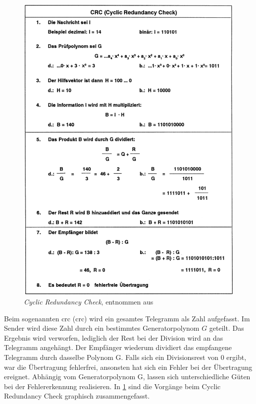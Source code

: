 \begin{figure}
\centering
\includegraphics[width=\textwidth]{abbildungen/20160314_crc}
\caption[\textit{Cyclic Redundancy Check}]{\textit{Cyclic Redundancy Check}, entnommen aus \cite[S.~38]{schn06}}
\label{fig:crc}
\end{figure}

Beim sogenannten \acrlong{crc} (\acrshort{crc}) wird ein gesamtes Telegramm als Zahl aufgefasst. Im Sender wird diese Zahl durch ein bestimmtes Generatorpolynom $G$ geteilt. Das Ergebnis wird verworfen, lediglich der Rest bei der Division wird an das Telegramm angehängt. Der Empfänger wiederum dividiert das empfangene Telegramm durch dasselbe Polynom G. Falls sich ein Divisionsrest von 0 ergibt, war die Übertragung fehlerfrei, ansonsten hat sich ein Fehler bei der Übertragung ereignet. Abhängig vom Generatorpolynom G, lassen sich unterschiedliche Güten bei der Fehlererkennung realisieren. In \ref{fig:crc} sind die Vorgänge beim Cyclic Redundancy Check graphisch zusammengefasst.


